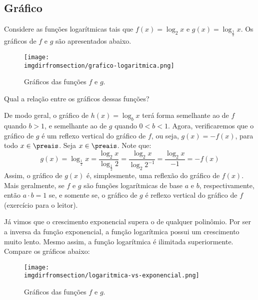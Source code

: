\subsection{Gráfico}

\begin{example}
    Considere as funções logarítmicas tais que $f(x) = \log_2 x$ e $g(x) = \log_{\frac 1 2} x$. Os gráficos de $f$ e $g$ são apresentados abaixo.
    \begin{figure}[H]
        \centering
        \texttt{[image: \\imgdirfromsection/grafico-logaritmica.png]}
        \caption{Gráficos das funções $f$ e $g$.}
        \label{img:grafico-logaritmica}
    \end{figure}
\end{example}

Qual a relação entre os gráficos dessas funções?

\begin{solution}
    De modo geral, o gráfico de $h(x) = \log_b x$ terá forma semelhante ao de $f$ quando $b>1$, e semelhante
    ao de  $g$ quando $0<b<1$. Agora, verificaremos que o gráfico de $g$ é um reflexo vertical do gráfico de $f$,
    ou seja, $g(x) =  -f(x)$, para todo $x \in \preais$. Seja $x \in \preais$.
    Note que:
    $$g(x) = \log_{\frac 1 2} x = \frac{\log_2 x}{\log_{\frac 1 2} 2}= \frac{\log_2 x}{\log_2 2^{-1}}=\frac{\log_2 x}{-1}=-f(x) $$
    Assim, o gráfico de $g(x)$ é, simplesmente, uma reflexão do gráfico de $f(x)$. Mais geralmente,
    se $f$ e $g$ são funções logarítmicas de base $a$ e $b$, respectivamente, então $a\cdot b = 1$ se,
    e somente se, o gráfico de $g$ é reflexo vertical do gráfico de $f$ (exercício para o leitor).
\end{solution}

\begin{remark}
    Já vimos que o crescimento exponencial supera o de qualquer polinômio. Por ser a inversa da função exponencial, a função logarítmica possui um crescimento muito lento. Mesmo assim, a função logarítmica é ilimitada superiormente. Compare os gráficos abaixo:
\end{remark}

\begin{figure}[H]
    \centering
    \texttt{[image: \\imgdirfromsection/logaritmica-vs-exponencial.png]}
    \caption{Gráficos das funções $f$ e $g$.}
    \label{img:logaritmica-vs-exponencial}
\end{figure}

\begin{onlineact}
\end{onlineact}